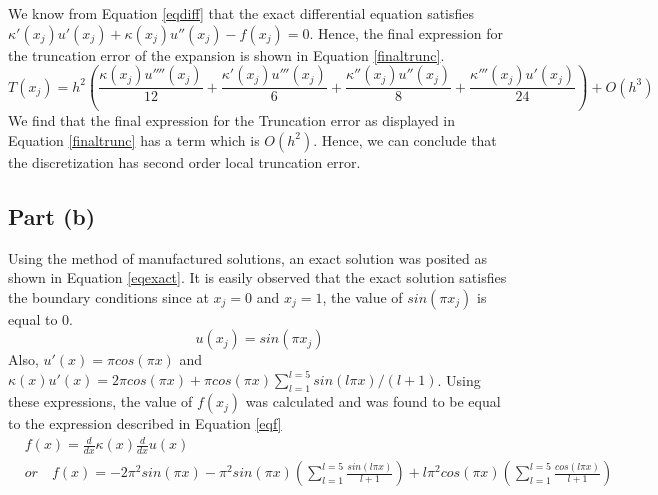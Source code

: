 \documentclass[12pt]{article}
\begin{document}
We know from Equation \ref{eqdiff} that the exact differential equation satisfies $ \kappa'(x_j)u'(x_j)+ \kappa(x_j) u''(x_j) - f(x_j) = 0$. Hence, the final expression for the truncation error of the expansion is shown in Equation \ref{finaltrunc}.
\begin{equation}\label{finaltrunc}
    T(x_j) = h^2 \left( \frac{\kappa(x_j) u''''(x_j)}{12} + \frac{\kappa'(x_j) u'''(x_j)}{6} + \frac{\kappa''(x_j) u''(x_j)}{8} + \frac{\kappa'''(x_j) u'(x_j)}{24} \right) + O(h^3) 
\end{equation}
We find that the final expression for the Truncation error as displayed in Equation \ref{finaltrunc} has a term which is $O(h^2)$. Hence, we can conclude that the discretization has second order local truncation error.
\subsection{Part (b)}
Using the method of manufactured solutions, an exact solution was posited as shown in Equation \ref{eqexact}. It is easily observed that the exact solution satisfies the boundary conditions since at $x_j = 0$ and $x_j = 1$, the value of $sin(\pi x_j)$ is equal to $0$.
\begin{equation} \label{eqexact}
    u(x_j) = sin(\pi x_j)
\end{equation}
Also, $u'(x) = \pi cos(\pi x)$ and $ \kappa(x)u'(x) = 2 \pi cos(\pi x) + \pi cos(\pi x) \sum_{l = 1}^{l = 5} sin(l \pi x)/(l + 1) $. Using these expressions, the value of $f(x_j)$ was calculated and was found to be equal to the expression described in Equation \ref{eqf}
\begin{equation} \label{eqf}
\begin{aligned}
    & f(x) = \frac{d}{dx} \kappa(x) \frac{d}{dx} u(x) \\
    & or \quad f(x) = -2\pi^2 sin(\pi x) - \pi^2 sin(\pi x) \left( \sum_{l = 1}^{l = 5} \frac{sin(l \pi x)}{l + 1} \right) + l \pi^2 cos(\pi x) \left( \sum_{l = 1}^{l = 5} \frac{cos(l \pi x)}{ l + 1 } \right)
\end{aligned}
\end{equation}
\end{document}
